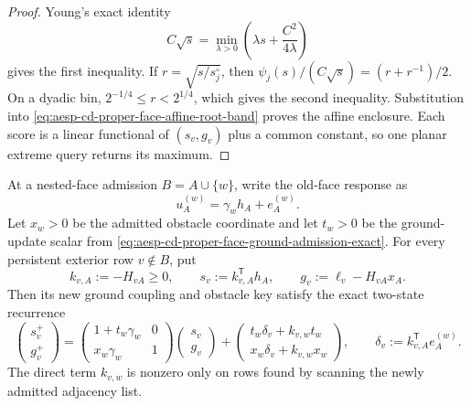 \begin{proof}
Young's exact identity
\begin{equation*}
 C\sqrt{s}
 =\min_{\lambda>0}
   \left(\lambda s+\frac{C^2}{4\lambda}\right)
\end{equation*}
gives the first inequality.  If
\(r=\sqrt{s/s_j^\circ}\), then
\(\psi_j(s)/(C\sqrt{s})=(r+r^{-1})/2\).
On a dyadic bin,
\(2^{-1/4}\leq r<2^{1/4}\), which gives the second inequality.
Substitution into
\cref{eq:aesp-cd-proper-face-affine-root-band} proves the affine enclosure.
Each score is a linear functional of \((s_v,g_v)\) plus a common constant,
so one planar extreme query returns its maximum.
\end{proof}

\begin{proposition}
\label{prop:aesp-cd-proper-face-lazy-rank-one-reporter}
At a nested-face admission \(B=A\cup\{w\}\), write the old-face response as
\begin{equation*}
 u_A^{(w)}=\gamma_wh_A+e_A^{(w)}.
\end{equation*}
Let \(x_w>0\) be the admitted obstacle coordinate and let \(t_w>0\) be the
ground-update scalar from
\cref{eq:aesp-cd-proper-face-ground-admission-exact}.  For every persistent
exterior row \(v\notin B\), put
\begin{equation*}
 k_{v,A}:=-H_{vA}\geq0,
 \qquad
 s_v:=k_{v,A}^{\mathsf T}h_A,
 \qquad
 g_v:=\ell_v-H_{vA}x_A.
\end{equation*}
Then its new ground coupling and obstacle key satisfy the exact two-state
recurrence
\begin{equation}
 \begin{pmatrix}s_v^+\\g_v^+\end{pmatrix}
 =
 \begin{pmatrix}
  1+t_w\gamma_w&0\\
  x_w\gamma_w&1
 \end{pmatrix}
 \begin{pmatrix}s_v\\g_v\end{pmatrix}
 +
 \begin{pmatrix}
  t_w\delta_v+k_{v,w}t_w\\
  x_w\delta_v+k_{v,w}x_w
 \end{pmatrix},
 \qquad
 \delta_v:=k_{v,A}^{\mathsf T}e_A^{(w)}.
 \label{eq:aesp-cd-proper-face-rank-one-two-state}
\end{equation}
The direct term \(k_{v,w}\) is nonzero only on rows found by scanning the
newly admitted adjacency list.


\end{proposition}
